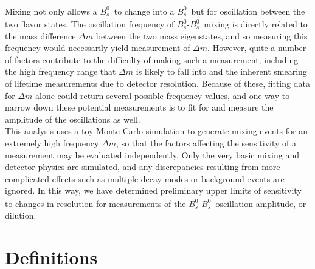 \documentclass[10pt]{article}
\newcommand{\Bs}{\mbox{$B_{s}^{0}$}}
\newcommand{\Bsbar}{\mbox{$\bar{B_{s}^{0}}$}}
\begin{document}
\noindent Mixing not only allows a \Bs\ to change into a \Bsbar\,
but for oscillation between the two flavor states. The oscillation
frequency of \Bs-\Bsbar\ mixing is directly related to the mass
difference $\Delta m$ between the two mass eigenstates, and so
measuring this frequency would necessarily yield measurement of
$\Delta m$. However, quite a number of factors contribute to the
difficulty of making such a measurement, including the high
frequency range that $\Delta m$ is likely to fall into and the
inherent smearing of lifetime measurements due to detector
resolution. Because of these, fitting data for $\Delta m$ alone
could return several possible frequency values, and one way to
narrow down these potential measurements is
to fit for and measure the amplitude of the oscillations as well.\\

\noindent This analysis uses a toy Monte Carlo simulation to
generate mixing events for an extremely high frequency $\Delta m$,
so that the factors affecting the sensitivity of a measurement may
be evaluated independently. Only the very basic mixing and
detector physics are simulated, and any discrepancies resulting
from more complicated effects such as multiple decay modes or
background events are ignored.  In this way, we have determined
preliminary upper limits of sensitivity to changes in resolution
for measurements of the \Bs-\Bsbar\ oscillation amplitude, or
dilution.

\section{Definitions}
\end{document}

